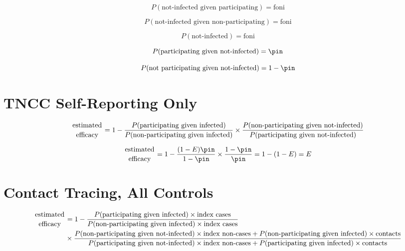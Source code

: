 \documentclass{article}
\begin{document}
\begin{equation*}
    P(\textrm{not-infected given participating}) = \textrm{foni}
\end{equation*}

\begin{equation*}
    P(\textrm{not-infected given non-participating}) = \textrm{foni}
\end{equation*}

\begin{equation*}
    P(\textrm{not-infected}) = \textrm{foni}
\end{equation*}

\begin{equation*}
    P(\textrm{participating given not-infected}) = \pin
\end{equation*}

\begin{equation*}
    P(\textrm{not participating given not-infected}) = 1-\pin
\end{equation*}

\section{TNCC Self-Reporting Only}

\begin{equation*}
\genfrac{}{}{0pt}{}{\textrm{estimated}}{\textrm{efficacy}} = 1 - \frac{P(\textrm{participating given infected})}{P(\textrm{non-participating given infected})}\times\frac{P(\textrm{non-participating given not-infected})}{P(\textrm{participating given not-infected})}    
\end{equation*}

\begin{equation*}
\genfrac{}{}{0pt}{}{\textrm{estimated}}{\textrm{efficacy}} = 1 - \frac{(1-E)\pin}{1-\pin}\times\frac{1-\pin}{\pin} = 1-(1-E) = E
\end{equation*}

\section{Contact Tracing, All Controls}

\begin{equation*}\begin{aligned}
\genfrac{}{}{0pt}{}{\textrm{estimated}}{\textrm{efficacy}} &= 1 - \frac{P(\textrm{participating given infected})\times \textrm{index cases}}{P(\textrm{non-participating given infected})\times \textrm{index cases}}\\
&\times\frac{P(\textrm{non-participating given not-infected})\times \textrm{index non-cases} + P(\textrm{non-participating given infected})\times\textrm{contacts}}{P(\textrm{participating given not-infected})\times \textrm{index non-cases} + P(\textrm{participating given infected})\times\textrm{contacts}}
\end{aligned}\end{equation*}
\end{document}
